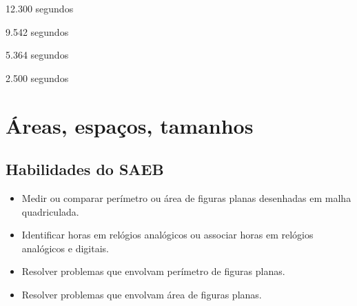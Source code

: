 \begin{escolha}
\item
  12.300 segundos
\item
  9.542 segundos
\item
  5.364 segundos
\item
  2.500 segundos
\end{escolha}



\chapter{Áreas, espaços, tamanhos}

\vspace*{-1.5cm}
\enlargethispage{3\baselineskip}

\section*{Habilidades do SAEB}

\begin{itemize}
\item Medir ou comparar perímetro ou área de figuras planas desenhadas em
malha quadriculada.

\item Identificar horas em relógios analógicos ou associar horas em relógios
analógicos e digitais.

\item Resolver problemas que envolvam perímetro de figuras planas.

\item Resolver problemas que envolvam área de figuras planas.
\end{itemize}


